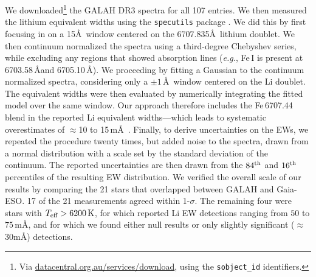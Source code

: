 \documentclass[12pt,twocolumn,tighten]{aastex63}
\begin{document}
We downloaded\footnote{Via \url{datacentral.org.au/services/download},
using the \texttt{sobject\_id} identifiers.} the GALAH DR3 spectra for
all 107 entries.  We then measured the lithium equivalent widths using
the \texttt{specutils} package \citep{specutils_v1pt1}.  We did this
by first focusing in on a 15\AA\ window centered on the 6707.835\AA\ 
lithium doublet.  We then continuum normalized the spectra using a
third-degree Chebyshev series, while excluding any regions that showed
absorption lines ({\it e.g.}, Fe\,\textsc{I} is present at
6703.58\,\AA and 6705.10\,\AA).  We proceeding by fitting a Gaussian
to the continuum normalized spectra, considering only a $\pm 1\,$\AA\ 
window centered on the Li doublet.  The equivalent widths were then
evaluated by numerically integrating the fitted model over the same
window.  Our approach therefore includes the Fe\,6707.44 blend in the
reported Li equivalent widths---which leads to systematic
overestimates of $\approx$10 to 15\,m\AA\ \citep[{\it
e.g.},][]{bouvier_pleiades_lirot_2018}.  Finally, to derive
uncertainties on the EWs, we repeated the procedure twenty times, but
added noise to the spectra, drawn from a normal distribution with a
scale set by the standard deviation of the continuum.  The reported
uncertainties are then drawn from the $84^{\rm th}$ and $16^{\rm th}$
percentiles of the resulting EW distribution.  We verified the overall
scale of our results by comparing the 21 stars that overlapped between
GALAH and Gaia-ESO.  17 of the 21 measurements agreed within
1-$\sigma$.  The remaining four were stars with $T_{\rm
eff}>6200\,{\rm K}$, for which \citet{randich_gaiaeso_2018} reported
Li EW detections ranging from $50$ to $75\,$m\AA, and for which we
found either null results or only slightly significant
($\approx$30m\AA) detections.

\end{document}
